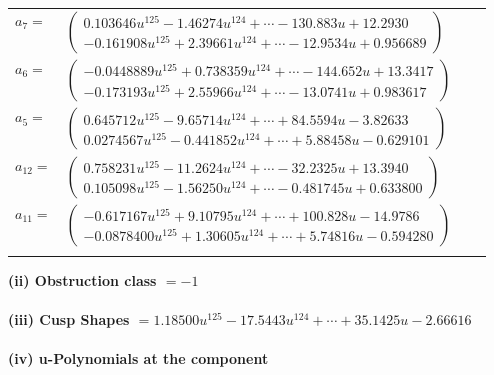 \documentclass[1p]{elsarticle_modified}
\theoremstyle{definition}
\begin{document}
\begin{tabular}{m{7pt} m{180pt} m{7pt} m{180pt} }
\flushright $a_{7}=$&$\begin{pmatrix}0.103646 u^{125}-1.46274 u^{124}+\cdots-130.883 u+12.2930\\-0.161908 u^{125}+2.39661 u^{124}+\cdots-12.9534 u+0.956689\end{pmatrix}$ \\
\flushright $a_{6}=$&$\begin{pmatrix}-0.0448889 u^{125}+0.738359 u^{124}+\cdots-144.652 u+13.3417\\-0.173193 u^{125}+2.55966 u^{124}+\cdots-13.0741 u+0.983617\end{pmatrix}$ \\
\flushright $a_{5}=$&$\begin{pmatrix}0.645712 u^{125}-9.65714 u^{124}+\cdots+84.5594 u-3.82633\\0.0274567 u^{125}-0.441852 u^{124}+\cdots+5.88458 u-0.629101\end{pmatrix}$ \\
\flushright $a_{12}=$&$\begin{pmatrix}0.758231 u^{125}-11.2624 u^{124}+\cdots-32.2325 u+13.3940\\0.105098 u^{125}-1.56250 u^{124}+\cdots-0.481745 u+0.633800\end{pmatrix}$ \\
\flushright $a_{11}=$&$\begin{pmatrix}-0.617167 u^{125}+9.10795 u^{124}+\cdots+100.828 u-14.9786\\-0.0878400 u^{125}+1.30605 u^{124}+\cdots+5.74816 u-0.594280\end{pmatrix}$\\&\end{tabular}
\flushleft \textbf{(ii) Obstruction class $= -1$}\\~\\
\flushleft \textbf{(iii) Cusp Shapes $= 1.18500 u^{125}-17.5443 u^{124}+\cdots+35.1425 u-2.66616$}\\~\\
\newpage\renewcommand{\arraystretch}{1}
\flushleft \textbf{(iv) u-Polynomials at the component}\newline \\
\end{document}

